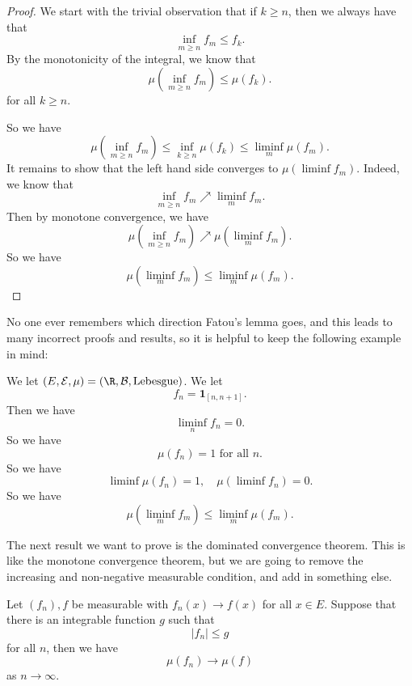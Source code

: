 \documentclass[a4paper]{article}
\begin{document}
\begin{proof}
  We start with the trivial observation that if $k\geq n$, then we always have that
  \[
    \inf_{m \geq n} f_m \leq f_k.
  \]
  By the monotonicity of the integral, we know that
  \[
    \mu\left(\inf_{m \geq n} f_m\right) \leq \mu(f_k).
  \]
  for all $k \geq n$.

  So we have
  \[
    \mu\left(\inf_{m \geq n} f_m\right) \leq \inf_{k \geq n} \mu(f_k) \leq \liminf_m \mu(f_m).
  \]
  It remains to show that the left hand side converges to $\mu(\liminf f_m)$. Indeed, we know that
  \[
    \inf_{m \geq n} f_m \nearrow \liminf_m f_m.
  \]
  Then by monotone convergence, we have
  \[
    \mu\left(\inf_{m \geq n} f_m\right) \nearrow \mu\left(\liminf_m f_m\right).
  \]
  So we have
  \[
    \mu\left(\liminf_m f_m\right) \leq \liminf_m \mu(f_m).
  \]
\end{proof}
No one ever remembers which direction Fatou's lemma goes, and this leads to many incorrect proofs and results, so it is helpful to keep the following example in mind:

\begin{eg}
  We let $(E, \mathcal{E}, \mu) = (\R, \mathcal{B}, \text{Lebesgue})$. We let
  \[
    f_n = \mathbf{1}_{[n, n + 1]}.
  \]
  Then we have
  \[
    \liminf_n f_n = 0.
  \]
  So we have
  \[
    \mu(f_n) = 1\text{ for all }n.
  \]
  So we have
  \[
    \liminf \mu(f_n) = 1,\quad \mu(\liminf f_n) = 0.
  \]
  So we have
  \[
    \mu\left(\liminf_m f_m\right) \leq \liminf_m \mu(f_m).
  \]
\end{eg}
The next result we want to prove is the dominated convergence theorem. This is like the monotone convergence theorem, but we are going to remove the increasing and non-negative measurable condition, and add in something else.
\begin{thm}
  Let $(f_n), f$ be measurable with $f_n(x) \to f(x)$ for all $x \in E$. Suppose that there is an integrable function $g$ such that
  \[
    |f_n| \leq g
  \]
  for all $n$, then we have
  \[
    \mu(f_n) \to \mu(f)
  \]
  as $n \to \infty$.
\end{thm}
\end{document}
